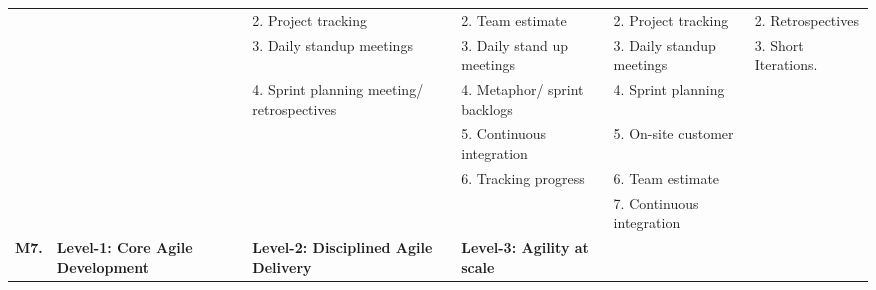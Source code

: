 \documentclass[a4paper,oneside]{bth}
\begin{document}
\begin{longtable}{|p{1.3cm}|p{2cm}|p{2cm}|p{2.7cm}|p{2cm} |p{2cm} |}
				&                                                      & 2. Project tracking                                         & 2. Team estimate                                                                                    & 2. Project tracking                                    & 2. Retrospectives                                                                            \\ \cline{3-6} 
				&                                                      & 3. Daily standup meetings                                   & 3. Daily stand up meetings                                                                          & 3. Daily standup meetings                              & 3. Short Iterations.                                                                         \\ \cline{3-6} 
				&                                                      & 4. Sprint planning meeting/ retrospectives                  & 4. Metaphor/ sprint backlogs                                                                        & 4. Sprint planning                                     & \multirow{4}{*}{}                                                                            \\ \cline{3-5}
				&                                                      & \multirow{3}{*}{}                                           & 5. Continuous integration                                                                           & 5. On-site customer                                    &                                                                                              \\ \cline{4-5}
				&                                                      &                                                             & 6. Tracking progress                                                                                & 6. Team estimate                                       &                                                                                              \\ \cline{4-5}
				&                                                      &                                                             &                                                                                                     & 7. Continuous integration                              &                                                                                              \\ \hline
				\multirow{10}{*}{\textbf{M7.}} & \textbf{Level-1: Core Agile Development}             & \textbf{Level-2: Disciplined Agile Delivery}                & \textbf{Level-3: Agility at scale}                                                                  & \textbf{}                                              &                                                                                              \\ \cline{2-6} 

\end{longtable}
\end{document}

